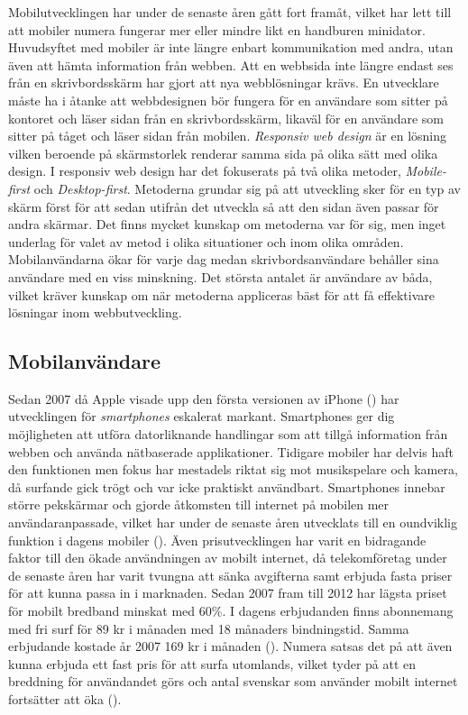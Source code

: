\documentclass[11pt]{article}
\begin{document}
Mobilutvecklingen har under de senaste åren gått fort framåt, vilket har lett till att mobiler numera fungerar mer eller mindre likt en handburen minidator. Huvudsyftet med mobiler är inte längre enbart kommunikation med andra, utan även att hämta information från webben. Att en webbsida inte längre endast ses från en skrivbordsskärm har gjort att nya webblösningar krävs. En utvecklare måste ha i åtanke att webbdesignen bör fungera för en användare som sitter på kontoret och läser sidan från en skrivbordsskärm, likaväl för en användare som sitter på tåget och läser sidan från mobilen. \textit{Responsiv web design} är en lösning vilken beroende på skärmstorlek renderar samma sida på olika sätt med olika design. I responsiv web design har det fokuserats på två olika metoder, \textit{Mobile-first} och \textit{Desktop-first}. Metoderna grundar sig på att utveckling sker för en typ av skärm först för att sedan utifrån det utveckla så att den sidan även passar för andra skärmar. Det finns mycket kunskap om metoderna var för sig, men inget underlag för valet av metod i olika situationer och inom olika områden. Mobilanvändarna ökar för varje dag medan skrivbordsanvändare behåller sina användare med en viss minskning. Det största antalet är användare av båda, vilket kräver kunskap om när metoderna appliceras bäst för att få effektivare lösningar inom webbutveckling.

\subsection{Mobilanvändare}

Sedan 2007 då Apple visade upp den första versionen av iPhone (\cite{AppleRevolution}) har utvecklingen för \textit{smartphones} eskalerat markant. Smartphones ger dig möjligheten att utföra datorliknande handlingar som att tillgå information från webben och använda nätbaserade applikationer. Tidigare mobiler har delvis haft den funktionen men fokus har mestadels riktat sig mot musikspelare och kamera, då surfande gick trögt och var icke praktiskt användbart.
Smartphones innebar större pekskärmar och gjorde åtkomsten till internet på mobilen mer användaranpassade, vilket har under de senaste åren utvecklats till en oundviklig funktion i dagens mobiler (\cite[s. 4]{Cfigroup_2009}).  Även prisutvecklingen har varit en bidragande faktor till den ökade användningen av mobilt internet, då telekomföretag under de senaste åren har varit tvungna att sänka avgifterna samt erbjuda fasta priser för att kunna passa in i marknaden. Sedan 2007 fram till 2012 har lägsta priset för mobilt bredband minskat med 60\%. I dagens erbjudanden finns abonnemang med fri surf för 89 kr i månaden med 18 månaders bindningstid. Samma erbjudande kostade år 2007 169 kr i månaden (\cite[s. 36]{pts}). Numera satsas det på att även kunna erbjuda ett fast pris för att surfa utomlands, vilket tyder på att en breddning för användandet görs och antal svenskar som använder mobilt internet fortsätter att öka (\cite{telekomidag}).
\end{document}

